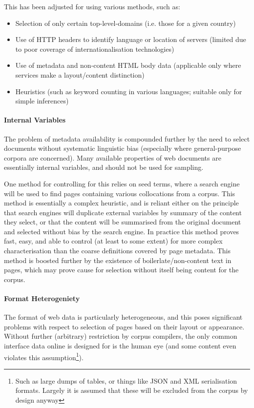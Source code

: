 This has been adjusted for using various methods, such as:

\begin{itemize}
    \item Selection of only certain top-level-domains (i.e. those for a given country)
    \item Use of HTTP headers to identify language or location of servers (limited due to poor coverage of internationalisation technologies)
    \item Use of metadata and non-content HTML body data (applicable only where services make a layout/content distinction)
    \item Heuristics (such as keyword counting in various languages; suitable only for simple inferences)
\end{itemize}


\paragraph{Internal Variables}
The problem of metadata availability is compounded further by the need to select documents without systematic linguistic bias (especially where general-purpose corpora are concerned).  Many available properties of web documents are essentially internal variables, and should not be used for sampling.

One method for controlling for this relies on seed terms, where a search engine will be used to find pages containing various collocations from a corpus.  This method is essentially a complex heuristic, and is reliant either on the principle that search engines will duplicate external variables by summary of the content they select, or that the content will be summarised from the original document and selected without bias by the search engine.  In practice this method proves fast, easy, and able to control (at least to some extent) for more complex characterisation than the coarse definitions covered by page metadata.  This method is boosted further by the existence of boilerlate/non-content text in pages, which may prove cause for selection without itself being content for the corpus.

\paragraph{Format Heterogeniety}
The format of web data is particularly heterogeneous, and this poses significant problems with respect to selection of pages based on their layout or appearance.  Without further (arbitrary) restriction by corpus compilers, the only common interface data online is designed for is the human eye (and some content even violates this assumption\footnote{Such as large dumps of tables, or things like JSON and XML serialisation formats.  Largely it is assumed that these will be excluded from the corpus by design anyway}).  

